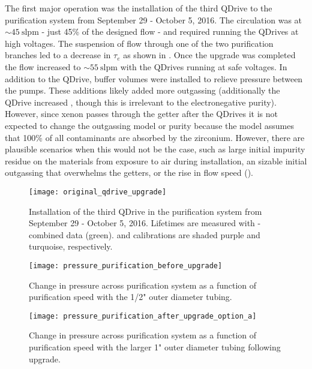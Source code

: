 The first major operation was the installation of the third QDrive to the purification system from September 29 - October 5, 2016.  The
circulation was at ${\sim} 45\ \mathrm{slpm}$ - just 45\% of the designed flow - and required running the QDrives at high voltages.  The
suspension of flow through one of the two purification branches led to a decrease in $\tau_e$ as shown in
.  Once the upgrade was completed the flow increased to
${\sim}55\ \mathrm{slpm}$ with
the QDrives running at safe voltages.  In addition to the QDrive, buffer volumes were installed to relieve pressure between
the pumps.  These additions likely added more outgassing
(additionally the QDrive increased , though this is irrelevant to the electronegative purity).  However, since xenon passes
through the
getter after the QDrives it is not expected to change the outgassing model or purity because the model assumes that 100\% of all
contaminants are
absorbed by the zirconium.  However, there are plausible scenarios when this would not be the case, such as large initial impurity residue
on the materials from exposure to air during installation, an sizable initial outgassing that overwhelms the getters, or the rise
in flow speed ().

\begin{figure}
\centering
\texttt{[image: original\_qdrive\_upgrade]}
\caption{Installation of the third QDrive in the purification system from September 29 - October 5, 2016.  Lifetimes are measured
with - combined data (green).   and \ambe calibrations are shaded purple and turquoise,
respectively.}
\label{fig:electron_lifetime_model_ops_original_qdrive_upgrade}
\end{figure}

\begin{figure}
\centering
\texttt{[image: pressure\_purification\_before\_upgrade]}
\caption{Change in pressure across purification system as a function of purification speed with the 1/2" outer diameter tubing.}
\label{fig:electron_lifetime_model_ops_original_pressure}
\end{figure}

\begin{figure}
\centering
\texttt{[image: pressure\_purification\_after\_upgrade\_option\_a]}
\caption{Change in pressure across purification system as a function of purification speed with the larger 1" outer diameter tubing following
upgrade.}
\label{fig:electron_lifetime_model_ops_improved_pressure}
\end{figure}

